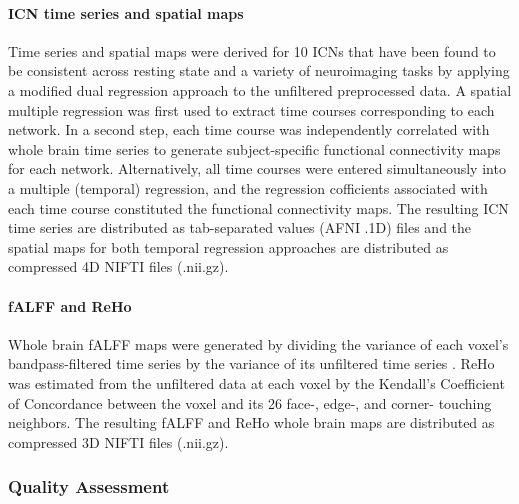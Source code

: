 \documentclass[preprint,12pt,5p]{elsarticle}
\begin{document}
\begin{itemize}
\paragraph{ICN time series and spatial maps} Time series and spatial maps were derived for 10 ICNs that have been found to be consistent across resting state and a variety of neuroimaging tasks  \cite{smith2009correspondence} by applying a modified dual regression approach \cite{Beckmann2009dualreg} to the unfiltered preprocessed data. A spatial multiple regression was first used to extract time courses corresponding to each network. In a second step, each time course was independently correlated with whole brain time series to generate subject-specific functional connectivity maps for each network. Alternatively, all time courses were entered simultaneously into a multiple (temporal) regression, and the regression cofficients associated with each time course constituted the functional connectivity maps. The resulting ICN time series are distributed as tab-separated values (AFNI .1D) files and the spatial maps for both temporal regression approaches are distributed as compressed 4D NIFTI files (.nii.gz).

\paragraph{fALFF and ReHo} Whole brain fALFF maps were generated by dividing the variance of each voxel's bandpass-filtered time series by the variance of its unfiltered time series \cite{zuo2008falff}. ReHo was estimated from the unfiltered data at each voxel by the Kendall's Coefficient of Concordance \cite{kendall1939w} between the voxel and its 26 face-, edge-, and corner- touching neighbors. The resulting fALFF and ReHo whole brain maps are distributed as compressed 3D NIFTI files (.nii.gz).

\subsubsection{Quality Assessment} 


\end{itemize}
\end{document}

